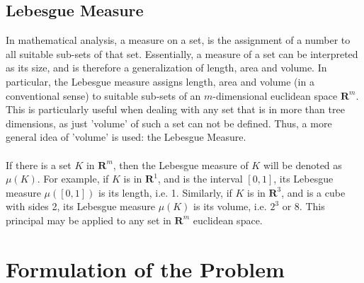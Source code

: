 \subsection{Lebesgue Measure} \label{measure}
In mathematical analysis, a measure on a set, is the assignment of a number to all suitable sub-sets of that set. \cite{cortzen_weisstein} Essentially, a measure of a set can be interpreted as its size, and is therefore a generalization of length, area and volume. In particular, the Lebesgue measure assigns length, area and volume (in a conventional sense) to suitable sub-sets of an $m$-dimensional euclidean space $\boldsymbol{R}^m$. \cite{lebesgue_1902} This is particularly useful when dealing with any set that is in more than tree dimensions, as just 'volume' of such a set can not be defined. Thus, a more general idea of 'volume' is used: the Lebesgue Measure.\\
\\
If there is a set $K$ in $\boldsymbol{R}^m$, then the Lebesgue measure of $K$ will be denoted as $\mu(K)$. For example, if $K$ is in $\boldsymbol{R}^1$, and is the interval $[0,1]$, its Lebesgue measure $\mu([0,1])$ is its length, i.e. 1. Similarly, if $K$ is in $\boldsymbol{R}^3$, and is a cube with sides 2, its Lebesgue measure $\mu(K)$ is its volume, i.e. $2^3$ or 8. This principal may be applied to any set in $\boldsymbol{R}^m$ euclidean space.

\section{Formulation of the Problem} \label{formulation}

